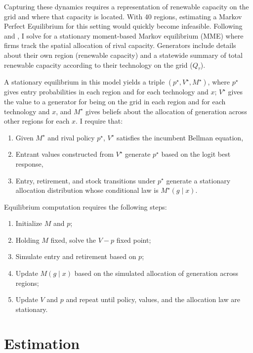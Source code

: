 \documentclass[12pt]{article}
\begin{document}
Capturing these dynamics requires a representation of renewable capacity on the grid and where that capacity is located. With 40 regions, estimating a Markov Perfect Equilibrium for this setting would quickly become infeasible. Following \cite{WeintraubBenkardVanRoy2008} and \cite{IfrachWeintraub2017}, I solve for a stationary moment-based Markov equilibrium (MME) where firms track the spatial allocation of rival capacity. Generators include details about their own region (renewable capacity) and a statewide summary of total renewable capacity according to their technology on the grid ($Q_\tau$). 

A stationary equilibrium in this model yields a triple $(p^\star, V^\star, M^\star)$, where $p^\star$ gives entry probabilities in each region and for each technology and $x$; $V^\star$ gives the value to a generator for being on the grid in each region and for each technology and $x$, and $M^\star$ gives beliefs about the allocation of generation across other regions for each $x$. I require that:
\begin{enumerate}
    \item Given $M^\star$ and rival policy $p^\star$, $V^\star$ satisfies the incumbent Bellman equation, 
    \item Entrant values constructed from $V^\star$ generate $p^\star$ based on the logit best response,
    \item Entry, retirement, and stock transitions under $p^\star$ generate a stationary allocation distribution whose conditional law is $M^\star (g \mid x)$.
\end{enumerate}

Equilibrium computation requires the following steps:
\begin{enumerate}
    \item Initialize $M$ and $p$;
    \item Holding $M$ fixed, solve the $V-p$ fixed point;
    \item Simulate entry and retirement based on $p$;
    \item Update $M(g \mid x)$ based on the simulated allocation of generation across regions;
    \item Update $V$ and $p$ and repeat until policy, values, and the allocation law are stationary.
\end{enumerate}

\section{Estimation}
\label{sec:estimation}
\end{document}
